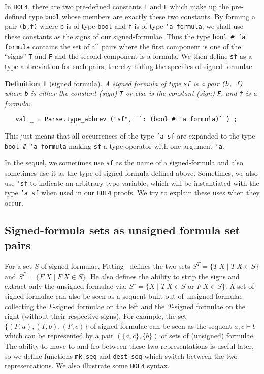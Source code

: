 \documentclass[a4paper]{article}
\newtheorem{definition}{Definition}
\newcommand{\hol}{\texttt{HOL4}}
\begin{document}
In \hol{}, there are two pre-defined constants \texttt{T} and
\texttt{F} which make up the pre-defined type \texttt{bool} whose
members are exactly these two constants. By forming a pair
\texttt{(b,f)} where \texttt{b} is of type \texttt{bool} and
\texttt{f} is of type \texttt{'a formula}, we shall use these
constants as the signs of our signed-formulae. Thus the type
\texttt{bool \# 'a formula} contains the set of all pairs where the
first component is one of the ``signs'' \texttt{T} and \texttt{F} and
the second component is a formula.  We then define \texttt{sf} as
a type abbreviation for such pairs, thereby hiding the specifics
of signed formulae.
\begin{definition}[signed formula]\label{def-signed-formula}
  A \emph{signed formula} of type
  \texttt{sf}
  is a pair \texttt{(b, f)} where
  \texttt{b} is either the constant (sign)
  \texttt{T} or else is the constant (sign)
  \texttt{F}, and 
  \texttt{f}
  is a formula:
\begin{verbatim}
   val _ = Parse.type_abbrev ("sf", ``: (bool # 'a formula)``) ;
\end{verbatim}
\end{definition}

This just means that all occurrences of the type \texttt{'a sf} are
expanded to the type \texttt{bool \# 'a formula} making
\texttt{sf} a type operator with one argument \texttt{'a}.

In the sequel, we sometimes use \texttt{sf} as the name of a
signed-formula and also sometimes use it as the type of signed formula
defined above. Sometimes, we also use \texttt{'sf} to indicate an
arbitrary type variable, which will be instantiated with the type
\texttt{'a sf} when used in our \hol{} proofs. We try to explain these
uses when they occur.

\subsection{Signed-formula sets as unsigned formula set pairs}

For a set $S$ of signed formulae, 
Fitting~\cite[Definition~5]{fitting-dual-tableau} 
defines the two sets 
$S^T = \{T~X \mid T~X \in S \}$ 
and
$S^F = \{F~X \mid F~X \in S \}$.
He also defines the ability to strip the signs and extract only the
unsigned formulae via:
$S^\circ = \{X \mid T~X \in S \mbox{ or } F~X \in S \}$.
%
A set of signed-formulae can also be seen as a sequent built out of
unsigned formulae collecting the \textit{F}-signed formulae on the
left and the \textit{T}-signed formulae on the right (without their
respective signs). For example, the set $\{(F,a), (T,b), (F,c)\}$ of
signed-formulae can be seen as the sequent $a,c \vdash b$ which can be
represented by a pair $(\{a,c\}, \{b\})$ of sets of (unsigned)
formulae. The ability to move to and fro between these two
representations is useful later, so we define functions
\texttt{mk\_seq} and \texttt{dest\_seq} which switch between the two
representations.  We also illustrate some \hol{} syntax.
\end{document}
